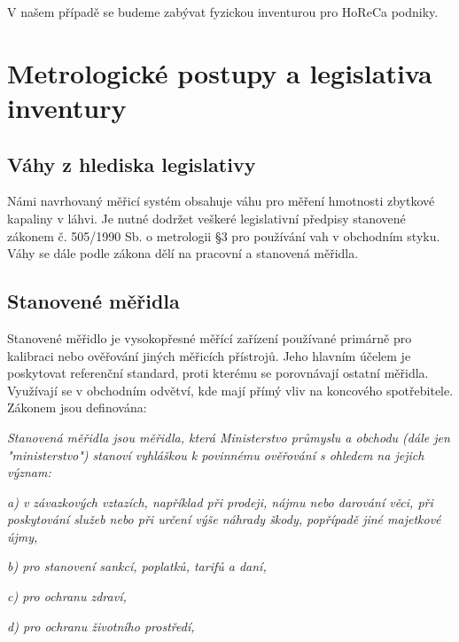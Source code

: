 V našem případě se budeme zabývat fyzickou inventurou pro HoReCa podniky. %

\section{Metrologické postupy a legislativa inventury}

\subsection{Váhy z hlediska legislativy}
Námi navrhovaný měřicí systém obsahuje váhu pro měření hmotnosti zbytkové kapaliny v láhvi. Je nutné dodržet veškeré legislativní předpisy stanovené zákonem č. 505/1990 Sb. o metrologii §3 pro používání vah v obchodním styku.
Váhy se dále podle zákona dělí na pracovní a stanovená měřidla. \cite{použití elektronických vah v obchodním styku}

\subsection{Stanovené měřidla}
Stanovené měřidlo je vysokopřesné měřící zařízení používané primárně pro kalibraci nebo ověřování jiných měřicích přístrojů. Jeho hlavním účelem je poskytovat referenční standard, proti kterému se porovnávají ostatní měřidla. Využívají se v obchodním odvětví, kde mají přímý vliv na koncového spotřebitele. Zákonem jsou definována:

\textit{Stanovená měřidla jsou měřidla, která Ministerstvo průmyslu a obchodu (dále jen "ministerstvo") stanoví vyhláškou k povinnému ověřování s ohledem na jejich význam:}

\textit{a) v závazkových vztazích, například při prodeji, nájmu nebo darování věci, při poskytování služeb nebo při určení výše náhrady škody, popřípadě jiné majetkové újmy,}

\textit{b) pro stanovení sankcí, poplatků, tarifů a daní,}

\textit{c) pro ochranu zdraví,}

\textit{d) pro ochranu životního prostředí,}

